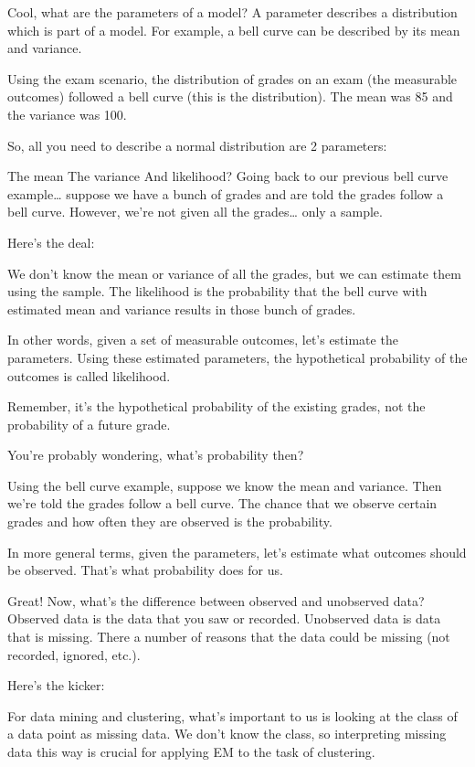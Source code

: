 Cool, what are the parameters of  a model? A parameter describes a distribution which is part of a model. For example, a bell curve can be described by its mean and variance.

Using the exam scenario, the distribution of grades on an exam (the measurable outcomes) followed a bell curve (this is the distribution). The mean was 85 and the variance was 100.

So, all you need to describe a normal distribution are 2 parameters:

The mean
The variance
And likelihood? Going back to our previous bell curve example… suppose we have a bunch of grades and are told the grades follow a bell curve. However, we’re not given all the grades… only a sample.

Here’s the deal:

We don’t know the mean or variance of all the grades, but we can estimate them using the sample. The likelihood is the probability that the bell curve with estimated mean and variance results in those bunch of grades.

In other words, given a set of measurable outcomes, let’s estimate the parameters. Using these estimated parameters, the hypothetical probability of the outcomes is called likelihood.

Remember, it’s the hypothetical probability of the existing grades, not the probability of a future grade.

You’re probably wondering, what’s probability then?

Using the bell curve example, suppose we know the mean and variance. Then we’re told the grades follow a bell curve. The chance that we observe certain grades and how often they are observed is the probability.

In more general terms, given the parameters, let’s estimate what outcomes should be observed. That’s what probability does for us.

Great! Now, what’s the difference between observed and unobserved data? Observed data is the data that you saw or recorded. Unobserved data is data that is missing. There a number of reasons that the data could be missing (not recorded, ignored, etc.).

Here’s the kicker:

For data mining and clustering, what’s important to us is looking at the class of a data point as missing data. We don’t know the class, so interpreting missing data this way is crucial for applying EM to the task of clustering.

